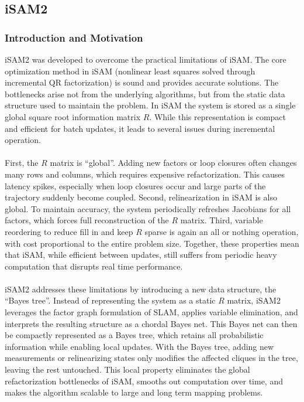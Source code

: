 \subsection{iSAM2}
\subsubsection{Introduction and Motivation}
iSAM2 was developed to overcome the practical limitations of iSAM. The core optimization method in iSAM (nonlinear least squares solved through incremental QR factorization) is sound and provides accurate solutions. The bottlenecks arise not from the underlying algorithms, but from the static data structure used to maintain the problem. In iSAM the system is stored as a single global square root information matrix $R$. While this representation is compact and efficient for batch updates, it leads to several issues during incremental operation.
\\ \\
First, the $R$ matrix is ``global''. Adding new factors or loop closures often changes many rows and columns, which requires expensive refactorization. This causes latency spikes, especially when loop closures occur and large parts of the trajectory suddenly become coupled. Second, relinearization in iSAM is also global. To maintain accuracy, the system periodically refreshes Jacobians for all factors, which forces full reconstruction of the $R$ matrix. Third, variable reordering to reduce fill in and keep $R$ sparse is again an all or nothing operation, with cost proportional to the entire problem size. Together, these properties mean that iSAM, while efficient between updates, still suffers from periodic heavy computation that disrupts real time performance.
\\ \\
iSAM2 addresses these limitations by introducing a new data structure, the ``Bayes tree''. Instead of representing the system as a static $R$ matrix, iSAM2 leverages the factor graph formulation of SLAM, applies variable elimination, and interprets the resulting structure as a chordal Bayes net. This Bayes net can then be compactly represented as a Bayes tree, which retains all probabilistic information while enabling local updates. With the Bayes tree, adding new measurements or relinearizing states only modifies the affected cliques in the tree, leaving the rest untouched. This local property eliminates the global refactorization bottlenecks of iSAM, smooths out computation over time, and makes the algorithm scalable to large and long term mapping problems. \cite{iSAM2_paper,Bayes_tree_for_SLAM_paper}



